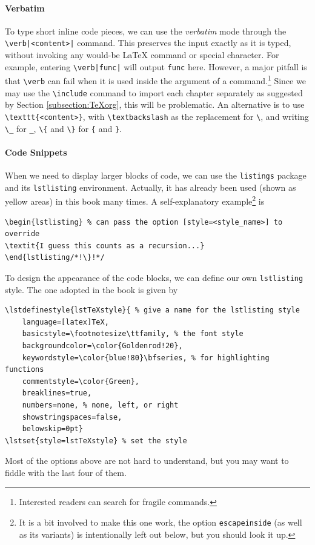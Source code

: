 \paragraph{Verbatim}
To type short inline code pieces, we can use the \textit{verbatim} mode through the \texttt{\textbackslash verb|<content>|} command. This preserves the input exactly as it is typed, without invoking any would-be \LaTeX{} command or special character. For example, entering \texttt{\textbackslash verb|func|} will output \verb|func| here. However, a major pitfall is that \texttt{\textbackslash verb} can fail when it is used inside the argument of a command.\footnote{Interested readers can search for fragile commands.} Since we may use the \texttt{\textbackslash include} command to import each chapter separately as suggested by Section \ref{subsection:TeXorg}, this will be problematic. An alternative is to use \texttt{\textbackslash texttt\{<content>\}}, with \texttt{\textbackslash textbackslash} as the replacement for \texttt{\textbackslash}, and writing \texttt{\textbackslash \_} for \texttt{\_}, \texttt{\textbackslash \{} and \texttt{\textbackslash \}} for \texttt{\{} and \texttt{\}}. 

\paragraph{Code Snippets}
When we need to display larger blocks of code, we can use the \verb|listings| package and its \verb|lstlisting| environment. Actually, it has already been used (shown as yellow areas) in this book many times. A self-explanatory example\footnote{It is a bit involved to make this one work, the option \texttt{escapeinside} (as well as its variants) is intentionally left out below, but you should look it up.} is
\begin{lstlisting}
\begin{lstlisting} % can pass the option [style=<style_name>] to override
\textit{I guess this counts as a recursion...}
\end{lstlisting/*!\}!*/
\end{lstlisting}
To design the appearance of the code blocks, we can define our own \verb|lstlisting| style. The one adopted in the book is given by
\begin{lstlisting}
\lstdefinestyle{lstTeXstyle}{ % give a name for the lstlisting style
    language=[latex]TeX, 
    basicstyle=\footnotesize\ttfamily, % the font style
    backgroundcolor=\color{Goldenrod!20},
    keywordstyle=\color{blue!80}\bfseries, % for highlighting functions
    commentstyle=\color{Green},
    breaklines=true, 
    numbers=none, % none, left, or right
    showstringspaces=false,
    belowskip=0pt}
\lstset{style=lstTeXstyle} % set the style
\end{lstlisting}
Most of the options above are not hard to understand, but you may want to fiddle with the last four of them.

